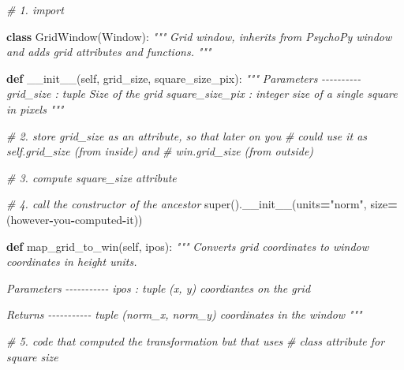 \documentclass[
]{book}
\newenvironment{Shaded}{\begin{snugshade}}{\end{snugshade}}
\newcommand{\BuiltInTok}[1]{#1}
\newcommand{\CommentTok}[1]{\textcolor[rgb]{0.56,0.35,0.01}{\textit{#1}}}
\newcommand{\FunctionTok}[1]{\textcolor[rgb]{0.00,0.00,0.00}{#1}}
\newcommand{\KeywordTok}[1]{\textcolor[rgb]{0.13,0.29,0.53}{\textbf{#1}}}
\newcommand{\NormalTok}[1]{#1}
\newcommand{\OperatorTok}[1]{\textcolor[rgb]{0.81,0.36,0.00}{\textbf{#1}}}
\newcommand{\StringTok}[1]{\textcolor[rgb]{0.31,0.60,0.02}{#1}}
\newcommand{\VariableTok}[1]{\textcolor[rgb]{0.00,0.00,0.00}{#1}}
\begin{document}
\begin{Shaded}
\begin{Highlighting}[]
\CommentTok{\# 1. import }

\KeywordTok{class}\NormalTok{ GridWindow(Window):}
    \CommentTok{"""}
\CommentTok{    Grid window, inherits from PsychoPy window and adds grid attributes and functions.}
\CommentTok{    """}

    \KeywordTok{def} \FunctionTok{\_\_init\_\_}\NormalTok{(}\VariableTok{self}\NormalTok{, grid\_size, square\_size\_pix):}
        \CommentTok{"""}
\CommentTok{        Parameters}
\CommentTok{        {-}{-}{-}{-}{-}{-}{-}{-}{-}{-}}
\CommentTok{        grid\_size : tuple}
\CommentTok{            Size of the grid}
\CommentTok{        square\_size\_pix : integer}
\CommentTok{            size of a single square in pixels}
\CommentTok{        """}
        
        \CommentTok{\# 2. store grid\_size as an attribute, so that later on you}
        \CommentTok{\#     could use it as self.grid\_size (from inside) and }
        \CommentTok{\#     win.grid\_size (from outside)}
        
        \CommentTok{\# 3. compute square\_size attribute}
        
        \CommentTok{\# 4. call the constructor of the ancestor}
        \BuiltInTok{super}\NormalTok{().}\FunctionTok{\_\_init\_\_}\NormalTok{(units}\OperatorTok{=}\StringTok{"norm"}\NormalTok{, size}\OperatorTok{=}\NormalTok{(however}\OperatorTok{{-}}\NormalTok{you}\OperatorTok{{-}}\NormalTok{computed}\OperatorTok{{-}}\NormalTok{it))}
        
    \KeywordTok{def}\NormalTok{ map\_grid\_to\_win(}\VariableTok{self}\NormalTok{, ipos):}
        \CommentTok{"""}
\CommentTok{        Converts grid coordinates to window coordinates in height units.}

\CommentTok{        Parameters}
\CommentTok{        {-}{-}{-}{-}{-}{-}{-}{-}{-}{-}{-}}
\CommentTok{        ipos : tuple}
\CommentTok{            (x, y) coordiantes on the grid}

\CommentTok{        Returns}
\CommentTok{        {-}{-}{-}{-}{-}{-}{-}{-}{-}{-}{-}}
\CommentTok{        tuple}
\CommentTok{            (norm\_x, norm\_y) coordinates in the window}
\CommentTok{        """}
        
        \CommentTok{\# 5. code that computed the transformation but that uses}
        \CommentTok{\#    class attribute for square size}
        
\end{Highlighting}
\end{Shaded}
\end{document}
